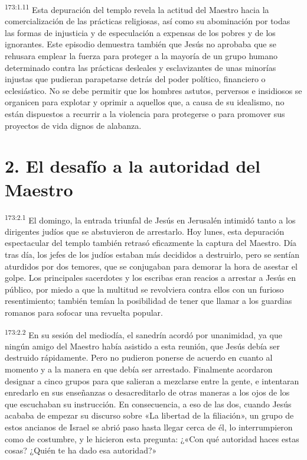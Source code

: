 \par 
\textsuperscript{173:1.11} Esta depuración del templo revela la actitud del Maestro hacia la comercialización de las prácticas religiosas, así como su abominación por todas las formas de injusticia y de especulación a expensas de los pobres y de los ignorantes. Este episodio demuestra también que Jesús no aprobaba que se rehusara emplear la fuerza para proteger a la mayoría de un grupo humano determinado contra las prácticas desleales y esclavizantes de unas minorías injustas que pudieran parapetarse detrás del poder político, financiero o eclesiástico. No se debe permitir que los hombres astutos, perversos e insidiosos se organicen para explotar y oprimir a aquellos que, a causa de su idealismo, no están dispuestos a recurrir a la violencia para protegerse o para promover sus proyectos de vida dignos de alabanza.

\section*{2. El desafío a la autoridad del Maestro}
\par 
\textsuperscript{173:2.1} El domingo, la entrada triunfal de Jesús en Jerusalén intimidó tanto a los dirigentes judíos que se abstuvieron de arrestarlo. Hoy lunes, esta depuración espectacular del templo también retrasó eficazmente la captura del Maestro. Día tras día, los jefes de los judíos estaban más decididos a destruirlo, pero se sentían aturdidos por dos temores, que se conjugaban para demorar la hora de asestar el golpe. Los principales sacerdotes y los escribas eran reacios a arrestar a Jesús en público, por miedo a que la multitud se revolviera contra ellos con un furioso resentimiento; también temían la posibilidad de tener que llamar a los guardias romanos para sofocar una revuelta popular.

\par 
\textsuperscript{173:2.2} En su sesión del mediodía, el sanedrín acordó por unanimidad, ya que ningún amigo del Maestro había asistido a esta reunión, que Jesús debía ser destruido rápidamente. Pero no pudieron ponerse de acuerdo en cuanto al momento y a la manera en que debía ser arrestado. Finalmente acordaron designar a cinco grupos para que salieran a mezclarse entre la gente, e intentaran enredarlo en sus enseñanzas o desacreditarlo de otras maneras a los ojos de los que escuchaban su instrucción. En consecuencia, a eso de las dos, cuando Jesús acababa de empezar su discurso sobre «La libertad de la filiación», un grupo de estos ancianos de Israel se abrió paso hasta llegar cerca de él, lo interrumpieron como de costumbre, y le hicieron esta pregunta: ¿«Con qué autoridad haces estas cosas? ¿Quién te ha dado esa autoridad?»

